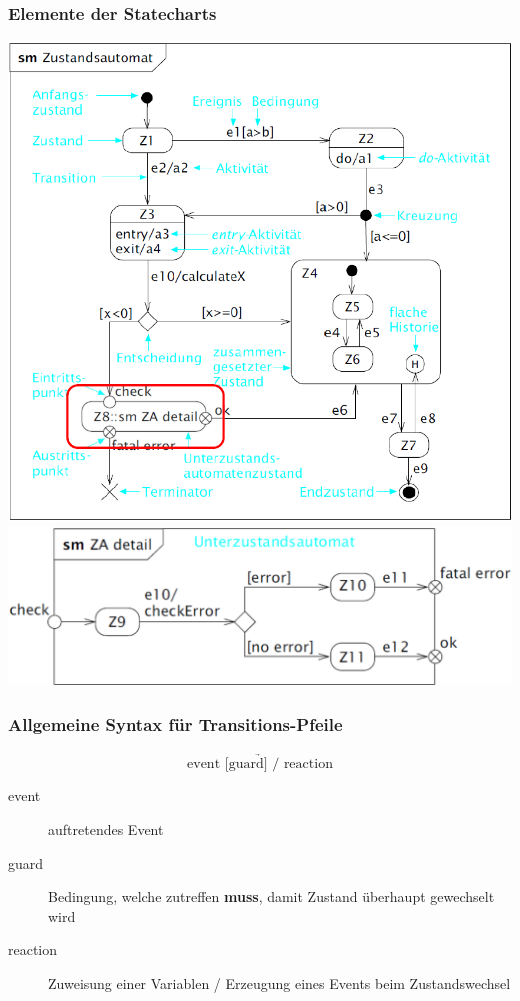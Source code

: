 \subsubsection{Elemente der Statecharts}

\begin{center}
    \includegraphics[width=0.7\columnwidth]{images/statechart_overview.png}
    \includegraphics[width=0.6\columnwidth]{images/statechart_overview_submachine.png}
\end{center}


\subsubsection{Allgemeine Syntax für Transitions-Pfeile}

$$ \underrightarrow{\text{event [guard] / reaction}} $$

\begin{description}
    \item[event] auftretendes Event
    \item[guard] Bedingung, welche zutreffen \textbf{muss}, damit Zustand überhaupt gewechselt wird 
    \item[reaction] Zuweisung einer Variablen / Erzeugung eines Events beim Zustandswechsel 
\end{description}


